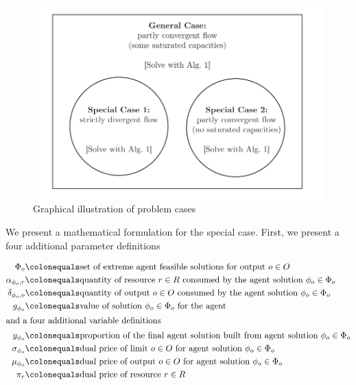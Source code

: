 \begin{figure}[h]
  \centering
  \includegraphics[width=\textwidth]{images/cases}
  \caption{Graphical illustration of problem cases}
  \label{fig:cases}
\end{figure}

We present a mathematical formulation for the special case. First, we present a four additional parameter definitions

\begin{align*}
\Phi_o &\colonequals  \text{set of extreme agent feasible solutions for output $o \in O$}\\
\alpha_{\phi_o,r} &\colonequals \text{quantity of resource $r \in R$ consumed by the agent solution $\phi_o \in \Phi_o$}\\
\delta_{\phi_o,o} &\colonequals \text{quantity of output $o \in O$ consumed by the agent solution $\phi_o \in \Phi_o$}\\
g_{\phi_o} &\colonequals \text{value of solution $\phi_o \in \Phi_o$ for the agent}\\
\intertext{and a four additional variable definitions}
y_{\phi_o} &\colonequals \text{proportion of the final agent solution built from agent solution $\phi_o \in \Phi_o$}\\
\sigma_{\phi_o} &\colonequals \text{dual price of limit $o \in O$ for agent solution $\phi_o \in \Phi_o$} \\
\mu_{\phi_o} &\colonequals \text{dual price of output $o \in O$ for agent solution $\phi_o \in \Phi_o$}\\
\pi_r &\colonequals \text{dual price of resource $r \in R$}\\
\end{align*}

